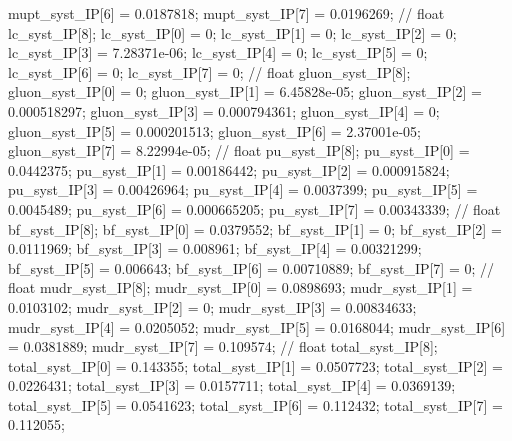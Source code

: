 mupt_syst_IP[6] = 0.0187818; mupt_syst_IP[7] = 0.0196269; 
// float lc_syst_IP[8];
lc_syst_IP[0] = 0; lc_syst_IP[1] = 0; lc_syst_IP[2] = 0; 
lc_syst_IP[3] = 7.28371e-06; lc_syst_IP[4] = 0; lc_syst_IP[5] = 0; 
lc_syst_IP[6] = 0; lc_syst_IP[7] = 0; 
// float gluon_syst_IP[8];
gluon_syst_IP[0] = 0; gluon_syst_IP[1] = 6.45828e-05; gluon_syst_IP[2] = 0.000518297; 
gluon_syst_IP[3] = 0.000794361; gluon_syst_IP[4] = 0; gluon_syst_IP[5] = 0.000201513; 
gluon_syst_IP[6] = 2.37001e-05; gluon_syst_IP[7] = 8.22994e-05; 
// float pu_syst_IP[8];
pu_syst_IP[0] = 0.0442375; pu_syst_IP[1] = 0.00186442; pu_syst_IP[2] = 0.000915824; 
pu_syst_IP[3] = 0.00426964; pu_syst_IP[4] = 0.0037399; pu_syst_IP[5] = 0.0045489; 
pu_syst_IP[6] = 0.000665205; pu_syst_IP[7] = 0.00343339; 
// float bf_syst_IP[8];
bf_syst_IP[0] = 0.0379552; bf_syst_IP[1] = 0; bf_syst_IP[2] = 0.0111969; 
bf_syst_IP[3] = 0.008961; bf_syst_IP[4] = 0.00321299; bf_syst_IP[5] = 0.006643; 
bf_syst_IP[6] = 0.00710889; bf_syst_IP[7] = 0; 
// float mudr_syst_IP[8];
mudr_syst_IP[0] = 0.0898693; mudr_syst_IP[1] = 0.0103102; mudr_syst_IP[2] = 0; 
mudr_syst_IP[3] = 0.00834633; mudr_syst_IP[4] = 0.0205052; mudr_syst_IP[5] = 0.0168044; 
mudr_syst_IP[6] = 0.0381889; mudr_syst_IP[7] = 0.109574; 
// float total_syst_IP[8];
total_syst_IP[0] = 0.143355; total_syst_IP[1] = 0.0507723; total_syst_IP[2] = 0.0226431; 
total_syst_IP[3] = 0.0157711; total_syst_IP[4] = 0.0369139; total_syst_IP[5] = 0.0541623; 
total_syst_IP[6] = 0.112432; total_syst_IP[7] = 0.112055; 



